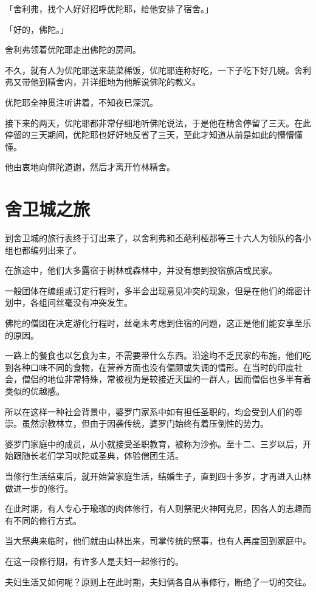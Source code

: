 \documentclass[twoside,openany]{book}
\begin{document}
「舍利弗，找个人好好招呼优陀耶，给他安排了宿舍。」

「好的，佛陀。」

舍利弗领着优陀耶走出佛陀的房间。

不久，就有人为优陀耶送来蔬菜稀饭，优陀耶连称好吃，一下子吃下好几碗。舍利弗又带他到精舍内，并详细地为他解说佛陀的教义。

优陀耶全神贯注听讲着，不知夜已深沉。

接下来的两天，优陀耶都非常仔细地听佛陀说法，于是他在精舍停留了三天。在此停留的三天期间，优陀耶也好好地反省了三天，至此才知道从前是如此的懵懵懂懂。

他由衷地向佛陀道谢，然后才离开竹林精舍。

\section{舍卫城之旅}\label{sec6.4}

到舍卫城的旅行表终于订出来了，以舍利弗和丕葩利桠那等三十六人为领队的各小组也都编列出来了。

在旅途中，他们大多露宿于树林或森林中，并没有想到投宿旅店或民家。

一般团体在编组或订定行程时，多半会出现意见冲突的现象，但是在他们的绵密计划中，各组间丝毫没有冲突发生。

佛陀的僧团在决定游化行程时，丝毫未考虑到住宿的问题，这正是他们能安享至乐的原因。

一路上的餐食也以乞食为主，不需要带什么东西。沿途均不乏民家的布施，他们吃到各种口味不同的食物，在营养方面也没有偏颇或失调的情形。在当时的印度社会，僧侣的地位非常特殊，常被视为是较接近天国的一群人，因而僧侣也多半有着类似的优越感。

所以在这样一种社会背景中，婆罗门家系中如有担任圣职的，均会受到人们的尊崇。虽然宗教林立，但由于因袭传统，婆罗门始终有着压倒性的势力。

婆罗门家庭中的成员，从小就接受圣职教育，被称为沙弥。至十二、三岁以后，开始跟随长老们学习吠陀或圣典，体验僧团生活。

当修行生活结束后，就开始营家庭生活，结婚生子，直到四十多岁，才再进入山林做进一步的修行。

在此时期，有人专心于瑜珈的肉体修行，有人则祭祀火神阿克尼，因各人的志趣而有不同的修行方式。

当大祭典来临时，他们就由山林出来，司掌传统的祭事，也有人再度回到家庭中。

在这一段修行期，有许多人是夫妇一起修行的。

夫妇生活又如何呢？原则上在此时期，夫妇俩各自从事修行，断绝了一切的交往。
\end{document}

